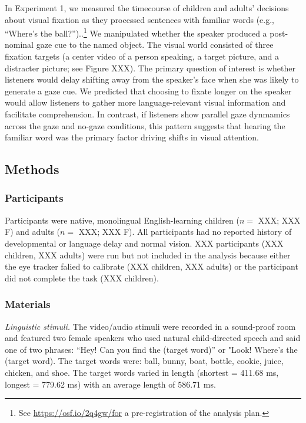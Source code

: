 \documentclass[man,floatsintext]{apa6}
\let\rmarkdownfootnote\footnote%
\def\footnote{\protect\rmarkdownfootnote}
\begin{document}
In Experiment 1, we measured the timecourse of children and adults'
decisions about visual fixation as they processed sentences with
familiar words (e.g., \enquote{Where's the ball?})..\footnote{See
  \url{https://osf.io/2q4gw/for} a pre-registration of the analysis
  plan.} We manipulated whether the speaker produced a post-nominal gaze
cue to the named object. The visual world consisted of three fixation
targets (a center video of a person speaking, a target picture, and a
distracter picture; see Figure XXX). The primary question of interest is
whether listeners would delay shifting away from the speaker's face when
she was likely to generate a gaze cue. We predicted that choosing to
fixate longer on the speaker would allow listeners to gather more
language-relevant visual information and facilitate comprehension. In
contrast, if listeners show parallel gaze dynmamics across the gaze and
no-gaze conditions, this pattern suggests that hearing the familiar word
was the primary factor driving shifts in visual attention.

\hypertarget{methods}{%
\subsection{Methods}\label{methods}}

\hypertarget{participants}{%
\subsubsection{Participants}\label{participants}}

Participants were native, monolingual English-learning children (\(n=\)
XXX; XXX F) and adults (\(n=\) XXX; XXX F). All participants had no
reported history of developmental or language delay and normal vision.
XXX participants (XXX children, XXX adults) were run but not included in
the analysis because either the eye tracker falied to calibrate (XXX
children, XXX adults) or the participant did not complete the task (XXX
children).

\hypertarget{materials}{%
\subsubsection{Materials}\label{materials}}

\emph{Linguistic stimuli.} The video/audio stimuli were recorded in a
sound-proof room and featured two female speakers who used natural
child-directed speech and said one of two phrases: \enquote{Hey! Can you
find the (target word)} or "Look! Where's the (target word). The target
words were: ball, bunny, boat, bottle, cookie, juice, chicken, and shoe.
The target words varied in length (shortest = 411.68 ms, longest =
779.62 ms) with an average length of 586.71 ms.
\end{document}

